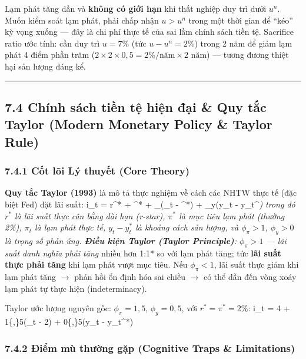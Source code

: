\documentclass[
]{article}
\begin{document}
Lạm phát tăng dần và \textbf{không có giới hạn} khi thất nghiệp duy trì
dưới \(u^n\). Muốn kiểm soát lạm phát, phải chấp nhận \(u > u^n\) trong
một thời gian để ``kéo'' kỳ vọng xuống --- đây là chi phí thực tế của
sai lầm chính sách tiền tệ. Sacrifice ratio ước tính: cần duy trì
\(u = 7\%\) (tức \(u - u^n = 2\%\)) trong 2 năm để giảm lạm phát 4 điểm
phần trăm
(\(2\times2\times0{,}5 = 2\%/\text{năm} \times 2 \text{ năm}\)) ---
tương đương thiệt hại sản lượng đáng kể.

\begin{center}\rule{0.5\linewidth}{0.5pt}\end{center}

\subsection{7.4 Chính sách tiền tệ hiện đại \& Quy tắc Taylor (Modern
Monetary Policy \& Taylor
Rule)}\label{chuxednh-suxe1ch-tiux1ec1n-tux1ec7-hiux1ec7n-ux111ux1ea1i-quy-tux1eafc-taylor-modern-monetary-policy-taylor-rule}

\subsubsection{7.4.1 Cốt lõi Lý thuyết (Core
Theory)}\label{cux1ed1t-luxf5i-luxfd-thuyux1ebft-core-theory-19}

\textbf{Quy tắc Taylor (1993)} là mô tả thực nghiệm về cách các NHTW
thực tế (đặc biệt Fed) đặt lãi suất: i\_t = r\^{}* + \pi\^{}* +
\phi\_\pi(\pi\_t - \pi\^{}*) + \phi\_y(y\_t - y\_t\^{}\emph{) trong đó
\(r^*\) là lãi suất thực cân bằng dài hạn (r-star), \(\pi^*\) là mục
tiêu lạm phát (thường 2\%), \(\pi_t\) là lạm phát thực tế,
\(y_t - y_t^*\) là khoảng cách sản lượng, và \(\phi_\pi > 1\),
\(\phi_y > 0\) là trọng số phản ứng. \textbf{Điều kiện Taylor (Taylor
Principle)}: \(\phi_\pi > 1\) --- lãi suất danh nghĩa phải tăng }nhiều
hơn 1:1* so với lạm phát tăng; tức \textbf{lãi suất thực phải tăng} khi
lạm phát vượt mục tiêu. Nếu \(\phi_\pi < 1\), lãi suất thực giảm khi lạm
phát tăng \(\rightarrow\) phản hồi ổn định hóa sai chiều \(\rightarrow\)
có thể dẫn đến vòng xoáy lạm phát tự thực hiện (indeterminacy).

Taylor ước lượng nguyên gốc: \(\phi_\pi = 1{,}5\), \(\phi_y = 0{,}5\),
với \(r^* = \pi^* = 2\%\): i\_t = 4 + 1\{,\}5(\pi\_t - 2) + 0\{,\}5(y\_t
- y\_t\^{}*)

\subsubsection{7.4.2 Điểm mù thường gặp (Cognitive Traps \&
Limitations)}\label{ux111iux1ec3m-muxf9-thux1b0ux1eddng-gux1eb7p-cognitive-traps-limitations-37}
\end{document}
